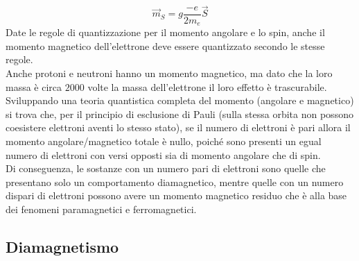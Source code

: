 \documentclass[]{article}
\begin{document}
\begin{equation}
	\vec{m}_S = g \frac{-e}{2m_e}\vec{S}
	\label{eq:2}
\end{equation}
Date le regole di quantizzazione per il momento angolare e lo spin, anche il momento magnetico dell'elettrone deve essere quantizzato secondo le stesse regole. \\ 
%
Anche protoni e neutroni hanno un momento magnetico, ma dato che la loro massa è circa $ 2000 $ volte la massa dell'elettrone il loro effetto è trascurabile. \\ 
%
Sviluppando una teoria quantistica completa del momento (angolare e magnetico) si trova che, per il principio di esclusione di Pauli (sulla stessa orbita non possono coesistere elettroni aventi lo stesso stato), se il numero di elettroni è pari allora il momento angolare/magnetico totale è nullo, poiché sono presenti un egual numero di elettroni con versi opposti sia di momento angolare che di spin. \\ 
Di conseguenza, le sostanze con un numero pari di elettroni sono quelle che presentano solo un comportamento diamagnetico, mentre quelle con un numero dispari di elettroni possono avere un momento magnetico residuo che è alla base dei fenomeni paramagnetici e ferromagnetici.

\subsection{Diamagnetismo}
\end{document}
